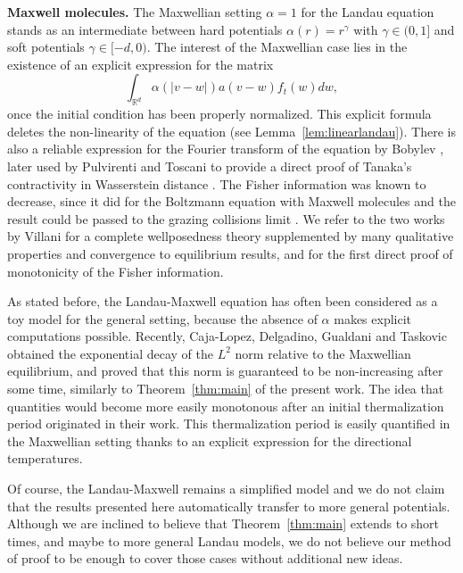 \documentclass[11pt,a4paper]{article}
\theoremstyle{definition}
\theoremstyle{plain}
\begin{document}
\noindent
\textbf{Maxwell molecules.} The Maxwellian setting $\alpha=1$ for the Landau equation stands as an intermediate between hard potentials $\alpha(r)=r^\gamma$ with $\gamma\in(0,1]$ and soft potentials $\gamma\in[-d,0)$. The interest of the Maxwellian case lies in the existence of an explicit expression for the matrix
$$\int_{\mathbb{R}^{d}} \alpha(\vert v-w\vert)a(v-w) f_t(w)dw ,$$
once the initial condition has been properly normalized. This explicit formula deletes the non-linearity of the equation (see Lemma~\ref{lem:linearlandau}). There is also a reliable expression for the Fourier transform of the equation by Bobylev \cite{Bobylev1975}, later used by Pulvirenti and Toscani \cite{PulvirentiToscani1996} to provide a direct proof of Tanaka's contractivity in Wasserstein distance \cite{Tanaka1978}. The Fisher information was known to decrease, since it did for the Boltzmann equation with Maxwell molecules and the result could be passed to the grazing collisions limit \cite{Toscani1998,Villani1998a}. We refer to the two works by Villani \cite{Villani1998b} for a complete wellposedness theory supplemented by many qualitative properties and convergence to equilibrium results, and \cite{Villani2000} for the first direct proof of monotonicity of the Fisher information.

As stated before, the Landau-Maxwell equation has often been considered as a toy model for the general setting, because the absence of $\alpha$ makes explicit computations possible. Recently, Caja-Lopez, Delgadino, Gualdani and Taskovic \cite{Caja-LopezDelgadinoGualdani2025} obtained the exponential decay of the $L^2$ norm relative to the Maxwellian equilibrium, and proved that this norm is guaranteed to be non-increasing after some time, similarly to Theorem~\ref{thm:main} of the present work. The idea that quantities would become more easily monotonous after an initial thermalization period originated in their work. This thermalization period is easily quantified in the Maxwellian setting thanks to an explicit expression for the directional temperatures.

Of course, the Landau-Maxwell remains a simplified model and we do not claim that the results presented here automatically transfer to more general potentials. Although we are inclined to believe that Theorem~\ref{thm:main} extends to short times, and maybe to more general Landau models, we do not believe our method of proof to be enough to cover those cases without additional new ideas.
\end{document}

